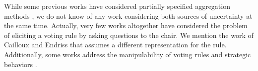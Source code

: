 \documentclass[runningheads]{llncs}
\theoremstyle{remark}
\begin{document}
While some previous works have considered partially specified aggregation methods \cite{Stein1994,Llamazares2013,Viappiani2018}, we do not know of any work considering both sources of uncertainty at the same time. 
Actually, very few works altogether have considered the problem of eliciting a voting rule by asking questions to the chair. We mention the work of Cailloux and Endriss \cite{Cailloux2014} that assumes a different representation for the rule. %
Additionally, some works address the manipulability of voting rules \cite{Elkind2012,Dey2018,Conitzer2011,Baumeister2019} and 
strategic behaviors \cite{Endriss2016,Lev2019,Annemieke2012}.
\end{document}

